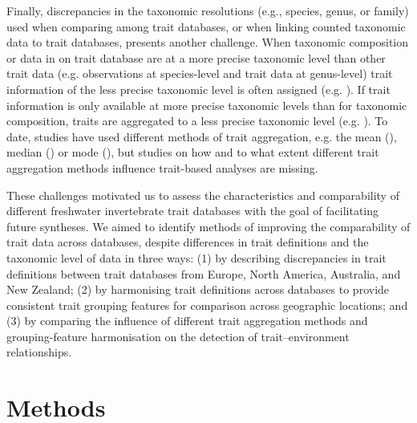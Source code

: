 \documentclass[12pt]{article}
\begin{document}
Finally, discrepancies in the taxonomic resolutions (e.g., species, genus, or family) used when comparing among trait databases, or when linking counted taxonomic data to trait databases, presents another challenge. When taxonomic composition or data in on trait database are at a more precise taxonomic level than other trait data (e.g. observations at species-level and trait data at genus-level) trait information of the less precise taxonomic level is often assigned (e.g. \cite{szocs_effects_2014, vos_taxonomic_2017}). If trait information is only available at more precise taxonomic levels than for taxonomic composition, traits are aggregated to a less precise taxonomic level (e.g. \cite{aspin_extreme_2019, piliere_a._f._h._importance_2016, poff_functional_2006, szocs_effects_2014}). To date, studies have used different methods of trait aggregation, e.g. the mean (\cite{magliozzi_functional_2019}), median (\cite{szocs_effects_2014}) or mode (\cite{piliere_a._f._h._importance_2016}), but studies on how and to what extent different trait aggregation methods influence trait-based analyses are missing. 

These challenges motivated us to assess the characteristics and comparability of different freshwater invertebrate trait databases with the goal of facilitating future syntheses. We aimed to identify methods of improving the comparability of trait data across databases, despite differences in trait definitions and the taxonomic level of data in three ways: (1) by describing discrepancies in trait definitions between trait databases from Europe, North America, Australia, and New Zealand; (2) by harmonising trait definitions across databases to provide consistent trait grouping features for comparison across geographic locations; and (3) by comparing the influence of different trait aggregation methods and grouping-feature harmonisation on the detection of trait–environment relationships.

\newpage

\section*{Methods}
\end{document}
